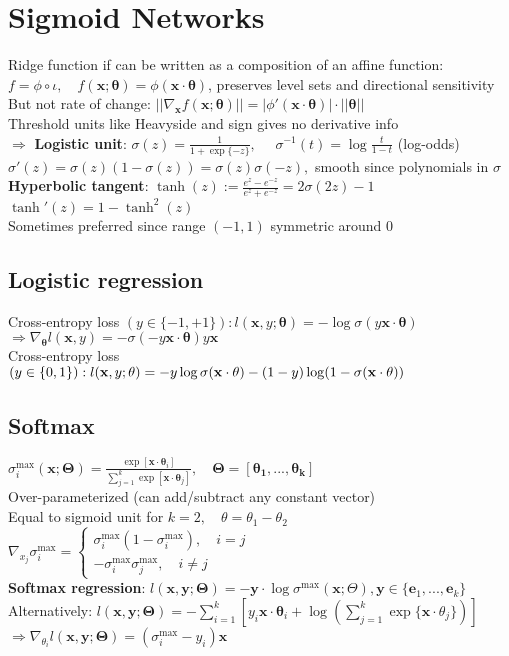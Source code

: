 \section*{Sigmoid Networks}

Ridge function if can be written as a composition of an affine function: $f=\phi\circ\iota, \quad f(\mathbf{x;\theta})=\phi(\mathbf{x\cdot\theta})$, preserves level sets and directional sensitivity\\
But not rate of change: $||\nabla_{\mathbf x}f(\mathbf{x;\theta})||=|\phi'(\mathbf{x\cdot\theta})|\cdot||\mathbf\theta||$\\
Threshold units like Heavyside and sign gives no derivative info\\
$\Rightarrow$ \textbf{Logistic unit}: $\sigma(z)=\frac{1}{1+\exp\{-z\}}, \quad$ $\sigma^{-1}(t)=\log\frac{t}{1-t}$ (log-odds)\\  $\sigma'(z)=\sigma(z)(1-\sigma(z))=\sigma(z)\sigma(-z),$ smooth since polynomials in $\sigma$\\
\textbf{Hyperbolic tangent}: $\tanh (z):=\frac{e^z-e^{-z}}{e^z+e^{-z}}=2\sigma(2z)-1$\\
$\tanh' (z)=1-\tanh^2(z)$\\
Sometimes preferred since range $(-1,1)$ symmetric around $0$
\subsection*{Logistic regression}
Cross-entropy loss $(y\in\{-1,+1\}): l(\mathbf x, y; \mathbf\theta)=-\log\sigma(y\mathbf{x\cdot\theta})$\\
$\Rightarrow \nabla_{\mathbf\theta}l(\mathbf x,y)=-\sigma(-y\mathbf{x\cdot\theta})y\mathbf x$\\
Cross-entropy loss $(y\in\{0,1\}):\\ l(\mathbf x, y; \mathbf\theta)=-y\log\sigma(\mathbf{x\cdot\theta})-(1-y)\log(1-\sigma(\mathbf{x\cdot\theta}))$
\subsection*{Softmax}
$\sigma_i^{\max}(\mathbf{x;\Theta})=\frac{\exp[\mathbf{x\cdot\theta}_i]}{\sum_{j=1}^k\exp[\mathbf{x\cdot\theta}_j]}, \quad \mathbf{\Theta=[\theta_1,...,\theta_k]}$\\
Over-parameterized (can add/subtract any constant vector)\\
Equal to sigmoid unit for $k=2, \quad \theta=\theta_1-\theta_2$\\
$\nabla_{x_j}\sigma^{\max}_i=\begin{cases}\sigma_i^{\max}(1-\sigma_i^{\max}), \quad i=j \\ -\sigma_i^{\max}\sigma_j^{\max}, \quad i\neq j
\end{cases}$\\
\textbf{Softmax regression}: $l(\mathbf{x,y;\Theta})=-\mathbf y\cdot\log\sigma^{\max}(\mathbf x;\Theta), \mathbf y\in\{\mathbf e_1,...,\mathbf e_k\}$\\
Alternatively: $l(\mathbf{x,y;\Theta})=-\sum_{i=1}^k[y_i\mathbf{x\cdot\theta}_i+\log(\sum_{j=1}^k\exp\{\mathbf x\cdot \theta_j\})]$\\
$\Rightarrow \nabla_{\theta_i}l(\mathbf{x,y;\Theta})=(\sigma_i^{\max}-y_i)\mathbf x$


